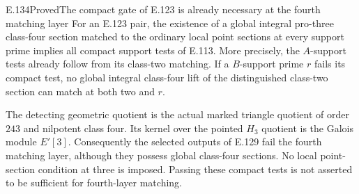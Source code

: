 \begin{result}{E.134}{Proved}{The compact gate of E.123 is already necessary at the fourth matching layer}
For an E.123 pair, the existence of a global integral
pro-three class-four section matched to the ordinary
local point sections at every support prime implies
all compact support tests of E.113. More precisely,
the $A$-support tests already follow from its class-two
matching. If a $B$-support prime $r$ fails its compact
test, no global integral class-four lift of the
distinguished class-two section can match at both
two and $r$.

The detecting geometric quotient is the actual marked
triangle quotient of order $243$ and nilpotent class
four. Its kernel over the pointed $H_3$ quotient is
the Galois module $E'[3]$. Consequently the selected
outputs of E.129 fail the fourth matching layer,
although they possess global class-four sections.
No local point-section condition at three is imposed.
Passing these compact tests is not asserted to be
sufficient for fourth-layer matching.
\end{result}
